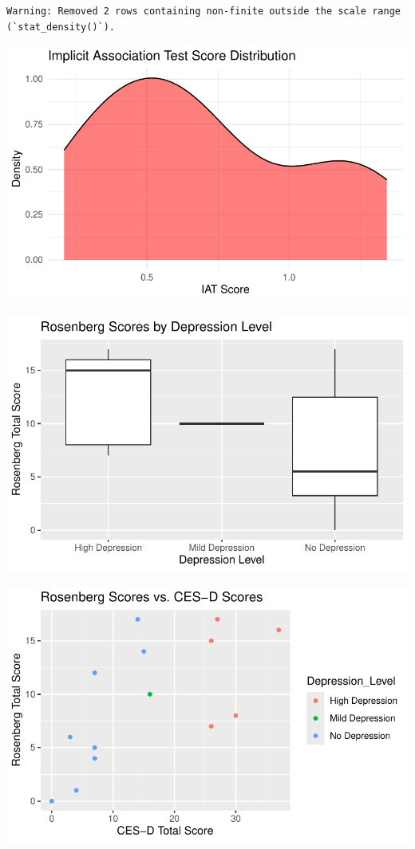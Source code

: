 \documentclass[
]{article}
\begin{document}
\begin{verbatim}
Warning: Removed 2 rows containing non-finite outside the scale range
(`stat_density()`).
\end{verbatim}

\includegraphics{SE-SCC-Depression_files/figure-pdf/IAT-score-distribution-1.pdf}

\includegraphics{SE-SCC-Depression_files/figure-pdf/RSES-versus-CESD-level-1.pdf}

\includegraphics{SE-SCC-Depression_files/figure-pdf/RSES-versus-CESD-total-1.pdf}
\end{document}
